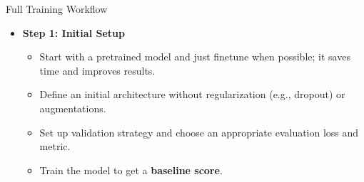 \documentclass[10pt]{beamer}
\theoremstyle{remark}
\theoremstyle{definition}
\begin{document}


    



\begin{frame}{Full Training Workflow}
\begin{itemize}
    \item \textbf{Step 1: Initial Setup}
    \begin{itemize}
        \item Start with a pretrained model and just finetune when possible; it saves time and improves results.
        \item Define an initial architecture without regularization (e.g., dropout) or augmentations.
        \item Set up validation strategy and choose an appropriate evaluation loss and metric.
        \item Train the model to get a \textbf{baseline score}.
    \end{itemize}
    
\end{itemize}
\end{frame}
\end{document}

